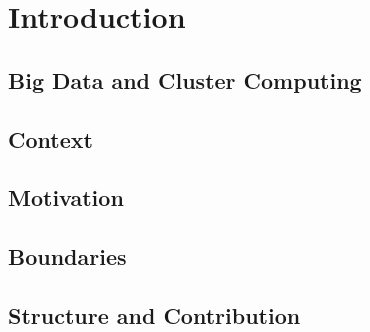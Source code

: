 \chapter{Introduction}

\section{Big Data and Cluster Computing}

\section{Context}

\section{Motivation}

\section{Boundaries}

\section{Structure and Contribution}